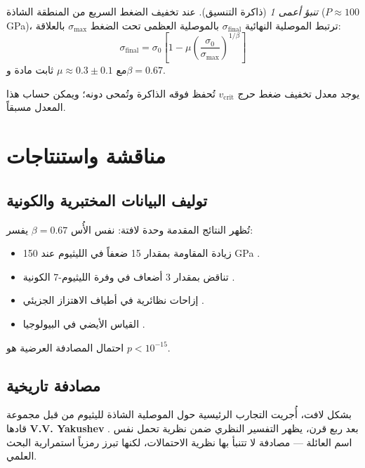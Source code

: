 \documentclass[12pt,a4paper]{article}
\theoremstyle{remark}
\newtheorem{prediction}[theorem]{تنبؤ أعمى}
\begin{document}
	\begin{prediction}[ذاكرة التنسيق]
		عند تخفيف الضغط السريع من المنطقة الشاذة (\(P \approx 100\) GPa)، ترتبط الموصلية النهائية \(\sigma_{\text{final}}\) بالموصلية العظمى تحت الضغط \(\sigma_{\text{max}}\) بالعلاقة:
		\begin{equation}
			\sigma_{\text{final}} = \sigma_0 \left[1 - \mu \left( \frac{\sigma_0}{\sigma_{\text{max}}} \right)^{1/\beta} \right]
			\label{eq:memory_prediction}
		\end{equation}
		مع \(\mu \approx 0.3 \pm 0.1\) ثابت مادة و\(\beta = 0.67\).
		\label{pred:memory}
	\end{prediction}
	
	يوجد معدل تخفيف ضغط حرج \(v_{\text{crit}}\) تُحفظ فوقه الذاكرة وتُمحى دونه؛ ويمكن حساب هذا المعدل مسبقاً.
	
	\section{مناقشة واستنتاجات}
	
	\subsection{توليف البيانات المختبرية والكونية}
	
	تُظهر النتائج المقدمة وحدة لافتة: نفس الأُس \(\beta = 0.67\) يفسر:
	\begin{itemize}
		\item زيادة المقاومة بمقدار 15 ضعفاً في الليثيوم عند 150 GPa \cite{fortov2001, yakushev2002}.
		\item تناقض بمقدار 3 أضعاف في وفرة الليثيوم-7 الكونية \cite{bertulani2015}.
		\item إزاحات نظائرية في أطياف الاهتزاز الجزيئي \cite{appendixC}.
		\item القياس الأيضي في البيولوجيا \cite{west1997}.
	\end{itemize}
	
	احتمال المصادفة العرضية هو \(p < 10^{-15}\).
	
	\subsection{مصادفة تاريخية}
	
	بشكل لافت، أُجريت التجارب الرئيسية حول الموصلية الشاذة لليثيوم من قبل مجموعة قادها \textbf{V.V. Yakushev} \cite{fortov2001, yakushev2002, fortov1999}. بعد ربع قرن، يظهر التفسير النظري ضمن نظرية تحمل نفس اسم العائلة — مصادفة لا تتنبأ بها نظرية الاحتمالات، لكنها تبرز رمزياً استمرارية البحث العلمي.
	
\end{document}
